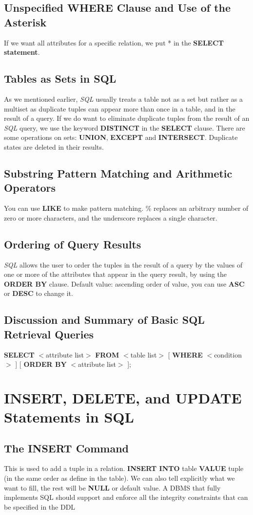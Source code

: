 \subsection{Unspecified WHERE Clause and Use of the Asterisk}
If we want all attributes for a specific relation, we put * in the \textbf{SELECT statement}.
\subsection{Tables as Sets in SQL}
As we mentioned earlier, \textit{SQL} usually treats a table not as a set but rather as a multiset as duplicate tuples can appear more than once in a table, and in the result of a query. If we do want to eliminate duplicate tuples from the result of an \textit{SQL} query, we use the keyword \textbf{DISTINCT} in the \textbf{SELECT} clause. There are some operations on sets: \textbf{UNION}, \textbf{EXCEPT} and \textbf{INTERSECT}. Duplicate states are deleted in their results.
\subsection{Substring Pattern Matching and Arithmetic Operators}
You can use \textbf{LIKE} to make pattern matching. \% replaces an arbitrary number of zero or more characters, and the underscore replaces a single character.
\subsection{Ordering of Query Results}
\textit{SQL} allows the user to order the tuples in the result of a query by the values of one or more of the attributes that appear in the query result, by using the \textbf{ORDER BY} clause. Default value: ascending order of value, you can use \textbf{ASC} or \textbf{DESC} to change it.
\subsection{Discussion and Summary of Basic SQL Retrieval Queries}
\textbf{SELECT} $<$attribute list$>$
\textbf{FROM} $<$table list$>$ 
[ \textbf{WHERE} $<$condition$>$ ]
[ \textbf{ORDER BY} $<$attribute list$>$ ];
\section{INSERT, DELETE, and UPDATE Statements in SQL}
\subsection{The INSERT Command}
This is used to add a tuple in a relation. \textbf{INSERT INTO} table \textbf{VALUE} tuple (in the same order as define in the table).
We can also tell explicitly what we want to fill, the rest will be \textbf{NULL} or default value.
A DBMS that fully implements SQL should support and enforce all the integrity constraints that can be specified in the DDL
